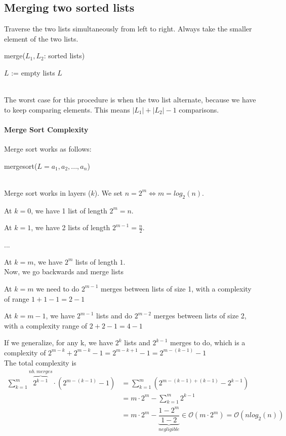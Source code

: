 \documentclass[10pt,a4paper]{book}
\begin{document}
\subsection{Merging two sorted lists}
Traverse the two lists simultaneously from left to right. Always take the smaller element of the two lists.
\begin{procedure}
\caption{merge($L_1,L_2$: sorted lists)}
\DontPrintSemicolon
\SetAlgoNoEnd
$L$ := empty lists
\KwRet $L$
\end{procedure}\\
The worst case for this procedure is when the two list alternate, because we have to keep comparing elements. This means $|L_1|+|L_2|-1$ comparisons.
\paragraph{Merge Sort Complexity}
Merge sort works as follows:\\
\begin{procedure}
\caption{mergesort($L=a_1,a_2,...,a_n$)}
\DontPrintSemicolon
\SetAlgoNoEnd
{}
\end{procedure}\\
Merge sort works in layers ($k$). We set $n=2^m \Leftrightarrow m=log_2(n)$.\par 
At $k=0$, we have 1 list of length $2^m=n$.\par 
At $k=1$, we have 2 lists of length $2^{m-1}=\frac{n}{2}$.\par
...\par
At $k=m$, we have $2^m$ lists of length $1$. \\
Now, we go backwards and merge lists\par
At $k=m$ we need to do $2^{m-1}$ merges between lists of size 1, with a complexity of range $1+1-1=2-1$\par 
At $k=m-1$, we have $2^{m-1}$ lists and do $2^{m-2}$ merges between lists of size 2, with a complexity range of $2+2-1=4-1$\par 
If we generalize, for any k, we have $2^k$ lists and $2^{k-1}$ merges to do, which is a complexity of $2^{m-k} + 2^{m-k} -1 = 2^{m-k+1} -1 = 2^{m-(k-1)} -1$\\
The total complexity is 
\begin{align*}
\sum_{k=1}^{m} \overbrace{2^{k-1}}^{nb.\ merges} \cdot (2^{m-(k-1)} -1) &= \sum_{k=1}^m (2^{m-(k-1)+(k-1)}-2^{k-1})\\
&= m\cdot 2^m - \sum_{k=1}^{m} 2^{k-1}\\
&= m\cdot 2^m - \underbrace{\dfrac{1-2^m}{1-2}}_{negligible} \in \mathcal{O}(m\cdot 2^m) = \mathcal{O}(nlog_2(n))
\end{align*}
\end{document}
